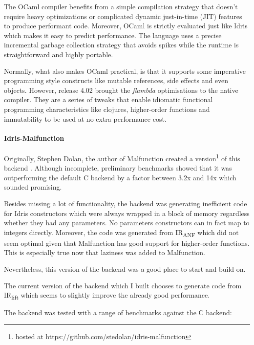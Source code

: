 \documentclass[a4paper,11pt,twocolumn]{article}
\begin{document}

The OCaml compiler benefits from a simple
compilation strategy that doesn't require heavy optimizations or
complicated dynamic just-in-time (JIT) features to produce performant
code. Moreover, OCaml is strictly evaluated just like Idris which
makes it easy to predict performance.
The language uses  a precise incremental garbage collection strategy
that avoids spikes while the runtime is straightforward and highly
portable.

Normally, what also makes OCaml practical, is that it supports some
imperative programming style constructs like mutable references,
side effects and even objects.
However, release 4.02 brought the \emph{flambda} optimisations to the
native compiler. They are a series of tweaks
that enable idiomatic functional programming characteristics like clojures,
higher-order functions and immutability to be used at no extra
performance cost.\cite{leroy2014ocaml}

\paragraph{Idris-Malfunction}

Originally, Stephen Dolan, the author of Malfunction created a
version\footnote{hosted at
    https://github.com/stedolan/idris-malfunction}
of this backend \cite{dolan2016malfunctional}.
Although incomplete, preliminary benchmarks showed that it was
outperforming the default C backend by a factor between 3.2x and 14x
which sounded promising.

Besides missing a lot of functionality, the backend was generating
inefficient code for Idris constructors which were always wrapped
in a block of memory regardless whether they had any parameters.
No parameters constructors can in fact map to integers directly.
Moreover, the code was generated from IR\textsubscript{ANF}
which did not seem optimal given that Malfunction has
good support for higher-order functions.
This is especially true now that laziness was added to Malfunction.

Nevertheless, this version of the backend was a good place to start
and build on.

The current version of the backend which I built chooses
to generate code from IR\textsubscript{lift} which seems to
slightly improve the already good performance.

The backend was tested with a range of benchmarks against the
C backend:
\end{document}
